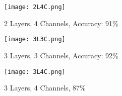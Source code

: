 \documentclass[a4paper]{article}
\begin{document}
\begin{figure}[h]
\centerline{\texttt{[image: 2L4C.png]}}
\caption{2 Layers, 4 Channels, Accuracy: 91\%}\label{placeholder}
\end{figure}

\begin{figure}[h]
\centerline{\texttt{[image: 3L3C.png]}}
\caption{3 Layers, 3 Channels, Accuracy: 92\%}\label{placeholder}
\end{figure}

\begin{figure}[h]
\centerline{\texttt{[image: 3L4C.png]}}
\caption{3 Layers, 4 Channels, 87\%}\label{placeholder}
\end{figure}
\fi





\end{document}
